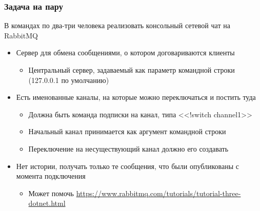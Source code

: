 \documentclass[xetex,mathserif,serif]{beamer}
\begin{document}
    \begin{frame}
        \frametitle{Задача на пару}
        В командах по два-три человека реализовать консольный сетевой чат на RabbitMQ
        \begin{itemize}
            \item Сервер для обмена сообщениями, о котором договариваются клиенты
            \begin{itemize}
                \item Центральный сервер, задаваемый как параметр командной строки (127.0.0.1 по умолчанию)
            \end{itemize}
            \item Есть именованные каналы, на которые можно переключаться и постить туда
            \begin{itemize}
                \item Должна быть команда подписки на канал, типа <<!switch channel1>>
                \item Начальный канал принимается как аргумент командной строки
                \item Переключение на несуществующий канал должно его создавать
            \end{itemize}
            \item Нет истории, получать только те сообщения, что были опубликованы с момента подключения
            \begin{itemize}
                \item Может помочь \url{https://www.rabbitmq.com/tutorials/tutorial-three-dotnet.html}
            \end{itemize}
        \end{itemize}
    \end{frame}
\end{document}
